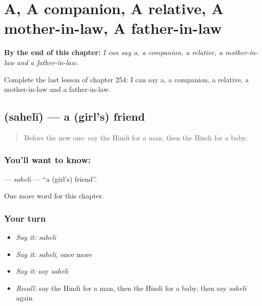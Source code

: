 
\chapter{A, A companion, A relative, A mother-in-law, A father-in-law}
\label{ch:hi-a-a-companion-a-relative-a-mother-in-law-a-father-in-law}

\begin{chapteropening}
\textbf{By the end of this chapter:} \emph{I can say a, a companion, a relative, a mother-in-law and a father-in-law.}

Complete the last lesson of chapter 254: I can say a, a companion, a relative, a mother-in-law and a father-in-law.
\end{chapteropening}

\section[\texorpdfstring{\hi{सहेली} (sahelī)}{सहेली (sahelī)}]{ (sahelī) — a (girl's) friend}

\label{lesson:HI-C254-saheli}



\begin{quote}
Before the new one: say the Hindi for a man, then the Hindi for a baby.
\end{quote}

\subsection*{You'll want to know: }
\textbf{} — \emph{sahelī} — \textquotedblleft{}a (girl's) friend\textquotedblright{}.

\begin{grammarlens}[title={What you've built}]
One more word for this chapter.
\end{grammarlens}

\subsection*{Your turn}
\begin{itemize}
\raggedright
  \item \emph{Say it:} \emph{sahelī}
  \item \emph{Say it:} \emph{sahelī}, once more
  \item \emph{Say it:} say \emph{sahelī}
  \item \emph{Recall:} say the Hindi for a man, then the Hindi for a baby, then say \emph{sahelī} again
\end{itemize}

